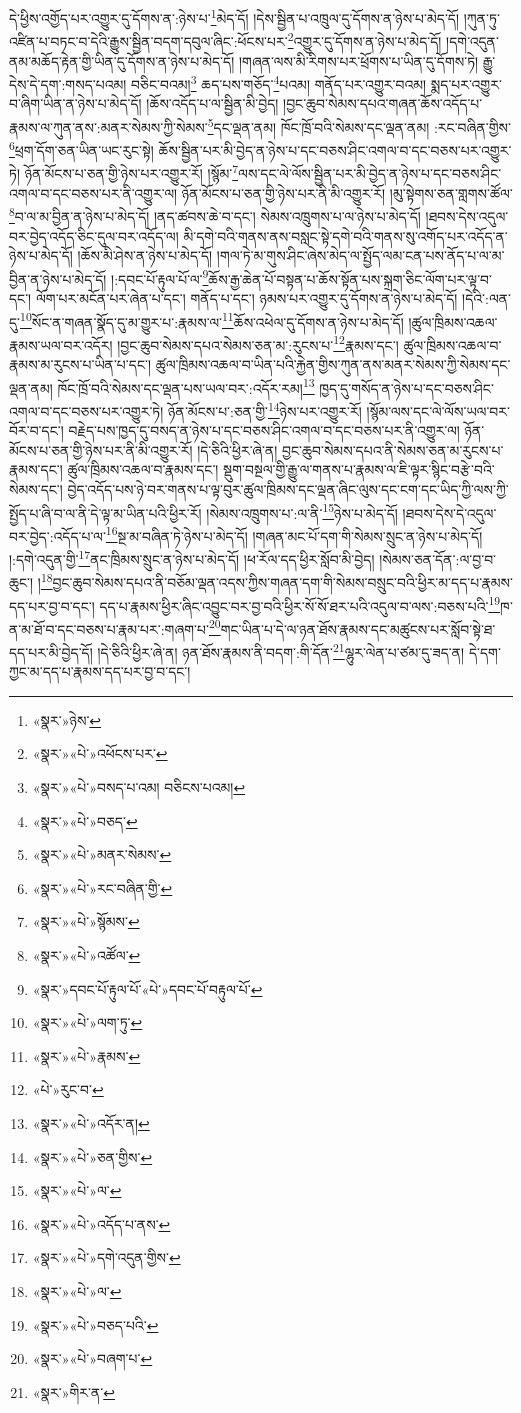 དེ་ཕྱིས་འགྱོད་པར་འགྱུར་དུ་དོགས་ན་:ཉེས་པ་\footnote{«སྣར་»ཉེས་}མེད་དོ། །དེས་སྦྱིན་པ་འཁྲུལ་དུ་དོགས་ན་ཉེས་པ་མེད་དོ། །ཀུན་ཏུ་འཛིན་པ་བཏང་བ་དེའི་རྒྱུས་སྦྱིན་བདག་དབུལ་ཞིང་:ཕོངས་པར་\footnote{«སྣར་»«པེ་»འཕོངས་པར་}འགྱུར་དུ་དོགས་ན་ཉེས་པ་མེད་དོ། །དགེ་འདུན་ནམ་མཆོད་རྟེན་གྱི་ཡིན་དུ་དོགས་ན་ཉེས་པ་མེད་དོ། །གཞན་ལས་མི་རིགས་པར་ཕྲོགས་པ་ཡིན་དུ་དོགས་ཏེ། རྒྱུ་དེས་དེ་དག་:གསད་པའམ། བཅིང་བའམ།\footnote{«སྣར་»«པེ་»བསད་པ་འམ། བཅིངས་པའམ།} ཆད་པས་གཅོད་\footnote{«སྣར་»«པེ་»བཅད་}པའམ། གནོད་པར་འགྱུར་བའམ། སྨད་པར་འགྱུར་བ་ཞིག་ཡིན་ན་ཉེས་པ་མེད་དོ། །ཆོས་འདོད་པ་ལ་སྦྱིན་མི་བྱེད། །བྱང་ཆུབ་སེམས་དཔའ་གཞན་ཆོས་འདོད་པ་རྣམས་ལ་ཀུན་ནས་:མནར་སེམས་ཀྱི་སེམས་\footnote{«སྣར་»«པེ་»མནར་སེམས་}དང་ལྡན་ནམ། ཁོང་ཁྲོ་བའི་སེམས་དང་ལྡན་ནམ། :རང་བཞིན་གྱིས་\footnote{«སྣར་»«པེ་»རང་བཞིན་གྱི་}ཕྲག་དོག་ཅན་ཡིན་ཡང་རུང་སྟེ། ཆོས་སྦྱིན་པར་མི་བྱེད་ན་ཉེས་པ་དང་བཅས་ཤིང་འགལ་བ་དང་བཅས་པར་འགྱུར་ཏེ། ཉོན་མོངས་པ་ཅན་གྱི་ཉེས་པར་འགྱུར་རོ། །སྙོམ་\footnote{«སྣར་»«པེ་»སྙོམས་}ལས་དང་ལེ་ལོས་སྦྱིན་པར་མི་བྱེད་ན་ཉེས་པ་དང་བཅས་ཤིང་འགལ་བ་དང་བཅས་པར་ནི་འགྱུར་ལ། ཉོན་མོངས་པ་ཅན་གྱི་ཉེས་པར་ནི་མི་འགྱུར་རོ། །མུ་སྟེགས་ཅན་གླགས་ཚོལ་\footnote{«སྣར་»«པེ་»འཚོལ་}བ་ལ་མ་བྱིན་ན་ཉེས་པ་མེད་དོ། །ནད་ཚབས་ཆེ་བ་དང་། སེམས་འཁྲུགས་པ་ལ་ཉེས་པ་མེད་དོ། །ཐབས་དེས་འདུལ་བར་བྱེད་འདོད་ཅིང་དུལ་བར་འདོད་ལ། མི་དགེ་བའི་གནས་ནས་བསླང་སྟེ་དགེ་བའི་གནས་སུ་འགོད་པར་འདོད་ན་ཉེས་པ་མེད་དོ། །ཆོས་མི་ཤེས་ན་ཉེས་པ་མེད་དོ། །གལ་ཏེ་མ་གུས་ཤིང་ཞེས་མེད་ལ་སྤྱོད་ལམ་ངན་པས་ནོད་པ་ལ་མ་བྱིན་ན་ཉེས་པ་མེད་དོ། །:དབང་པོ་རྟུལ་པོ་ལ་\footnote{«སྣར་»དབང་པོ་རྟུལ་པོ་«པེ་»དབང་པོ་བརྟུལ་པོ་}ཆོས་རྒྱ་ཆེན་པོ་བསྟན་པ་ཆོས་སྟོན་པས་སྐྲག་ཅིང་ལོག་པར་ལྟ་བ་དང་། ལོག་པར་མངོན་པར་ཞེན་པ་དང་། གནོད་པ་དང་། ཉམས་པར་འགྱུར་དུ་དོགས་ན་ཉེས་པ་མེད་དོ། །དེའི་:ལན་དུ་\footnote{«སྣར་»«པེ་»ལག་ཏུ་}སོང་ན་གཞན་སྣོད་དུ་མ་གྱུར་པ་:རྣམས་ལ་\footnote{«སྣར་»«པེ་»རྣམས་}ཆོས་འཕེལ་དུ་དོགས་ན་ཉེས་པ་མེད་དོ། །ཚུལ་ཁྲིམས་འཆལ་རྣམས་ཡལ་བར་འདོར། །བྱང་ཆུབ་སེམས་དཔའ་སེམས་ཅན་མ་:རུངས་པ་\footnote{«པེ་»རུང་བ་}རྣམས་དང་། ཚུལ་ཁྲིམས་འཆལ་བ་རྣམས་མ་རུངས་པ་ཡིན་པ་དང་། ཚུལ་ཁྲིམས་འཆལ་བ་ཡིན་པའི་རྐྱེན་གྱིས་ཀུན་ནས་མནར་སེམས་ཀྱི་སེམས་དང་ལྡན་ནམ། ཁོང་ཁྲོ་བའི་སེམས་དང་ལྡན་པས་ཡལ་བར་:འདོར་རམ།\footnote{«སྣར་»«པེ་»འདོར་ན།} ཁྱད་དུ་གསོད་ན་ཉེས་པ་དང་བཅས་ཤིང་འགལ་བ་དང་བཅས་པར་འགྱུར་ཏེ། ཉོན་མོངས་པ་:ཅན་གྱི་\footnote{«སྣར་»«པེ་»ཅན་གྱིས་}ཉེས་པར་འགྱུར་རོ། །སྙོམ་ལས་དང་ལེ་ལོས་ཡལ་བར་བོར་བ་དང་། བརྗེད་པས་ཁྱད་དུ་བསད་ན་ཉེས་པ་དང་བཅས་ཤིང་འགལ་བ་དང་བཅས་པར་ནི་འགྱུར་ལ། ཉོན་མོངས་པ་ཅན་གྱི་ཉེས་པར་ནི་མི་འགྱུར་རོ། །དེ་ཅིའི་ཕྱིར་ཞེ་ན། བྱང་ཆུབ་སེམས་དཔའ་ནི་སེམས་ཅན་མ་རུངས་པ་རྣམས་དང་། ཚུལ་ཁྲིམས་འཆལ་བ་རྣམས་དང་། སྡུག་བསྔལ་གྱི་རྒྱུ་ལ་གནས་པ་རྣམས་ལ་ཇི་ལྟར་སྙིང་བརྩེ་བའི་སེམས་དང་། བྱེད་འདོད་པས་ཉེ་བར་གནས་པ་ལྟ་བུར་ཚུལ་ཁྲིམས་དང་ལྡན་ཞིང་ལུས་དང་ངག་དང་ཡིད་ཀྱི་ལས་ཀྱི་སྤྱོད་པ་ཞི་བ་ལ་ནི་དེ་ལྟ་མ་ཡིན་པའི་ཕྱིར་རོ། །སེམས་འཁྲུགས་པ་:ལ་ནི་\footnote{«སྣར་»«པེ་»ལ་}ཉེས་པ་མེད་དོ། །ཐབས་དེས་དེ་འདུལ་བར་བྱེད་:འདོད་པ་ལ་\footnote{«སྣར་»«པེ་»འདོད་པ་ནས་}སྔ་མ་བཞིན་ཏེ་ཉེས་པ་མེད་དོ། །གཞན་མང་པོ་དག་གི་སེམས་སྲུང་ན་ཉེས་པ་མེད་དོ། །:དགེ་འདུན་གྱི་\footnote{«སྣར་»«པེ་»དགེ་འདུན་གྱིས་}ནང་ཁྲིམས་སྲུང་ན་ཉེས་པ་མེད་དོ། །ཕ་རོལ་དད་ཕྱིར་སློབ་མི་བྱེད། །སེམས་ཅན་དོན་:ལ་བྱ་བ་ཆུང་། །\footnote{«སྣར་»«པེ་»ལ་}བྱང་ཆུབ་སེམས་དཔའ་ནི་བཅོམ་ལྡན་འདས་ཀྱིས་གཞན་དག་གི་སེམས་བསྲུང་བའི་ཕྱིར་མ་དད་པ་རྣམས་དད་པར་བྱ་བ་དང་། དད་པ་རྣམས་ཕྱིར་ཞིང་འབྱུང་བར་བྱ་བའི་ཕྱིར་སོ་སོ་ཐར་པའི་འདུལ་བ་ལས་:བཅས་པའི་\footnote{«སྣར་»«པེ་»བཅད་པའི་}ཁ་ན་མ་ཐོ་བ་དང་བཅས་པ་རྣམ་པར་:གཞག་པ་\footnote{«སྣར་»«པེ་»བཞག་པ་}གང་ཡིན་པ་དེ་ལ་ཉན་ཐོས་རྣམས་དང་མཚུངས་པར་སློབ་སྟེ་ཐ་དད་པར་མི་བྱེད་དོ། །དེ་ཅིའི་ཕྱིར་ཞེ་ན། ཉན་ཐོས་རྣམས་ནི་བདག་:གི་དོན་\footnote{«སྣར་»གིར་ན་}ལྷུར་ལེན་པ་ཙམ་དུ་ཟད་ན། དེ་དག་ཀྱང་མ་དད་པ་རྣམས་དད་པར་བྱ་བ་དང་། 